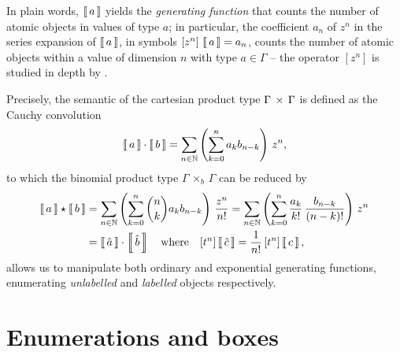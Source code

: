 In plain words, $\left\llbracket\,a\,\right\rrbracket$ yields  the \textit{generating function} that
counts the number of atomic objects in values of type $a$; in particular, the
coefficient $a_{n}$ of $z^{n}$ in the series expansion of $\left\llbracket\,a\,\right\rrbracket$, in
symbols $[z^{n}]\,\left\llbracket\,a\,\right\rrbracket = a_{n}$, counts the number of atomic objects
within a value of dimension $n$ with type $a\in\Gamma$ -- the operator
$[z^{n}]$ is studied in depth by \citet{MSV07}.

Precisely, the semantic of the cartesian product type
$\Gamma\,\times\,\Gamma$ is defined as the Cauchy convolution
\begin{displaymath}
    \left\llbracket\,a\,\right\rrbracket\cdot\left\llbracket\,b\,\right\rrbracket = \sum_{n\in\mathbb{N}}{\left(\sum_{k=0}^{n}{a_{k}b_{n-k}}\right)\,z^{n}},
\end{displaymath}
to which the binomial product type $\Gamma\,\times_{b}\,\Gamma$ can be reduced by
\begin{displaymath}
\begin{split}
    \left\llbracket\,a\,\right\rrbracket\star\left\llbracket\,b\,\right\rrbracket
        &= \sum_{n\in\mathbb{N}}{\left(\sum_{k=0}^{n}{{ {n}\choose{k} }a_{k}b_{n-k}}\right)\,\frac{z^{n}}{n!}}
         = \sum_{n\in\mathbb{N}}{\left(\sum_{k=0}^{n}{\frac{a_{k}}{k!}\,\frac{b_{n-k}}{(n-k)!}}\right)\,z^{n}} \\
        &= \left\llbracket\,\hat{a}\,\right\rrbracket\cdot\left\llbracket\,\hat{b}\,\right\rrbracket \quad\text{where}\quad[t^{n}]\left\llbracket\,\hat{c}\,\right\rrbracket = \frac{1}{n!}\,[t^{n}]\left\llbracket\,c\,\right\rrbracket,
\end{split}
\end{displaymath}
allows us to manipulate both ordinary and exponential generating functions,
enumerating \textit{unlabelled} and \textit{labelled} objects respectively.

\section{Enumerations and boxes}

